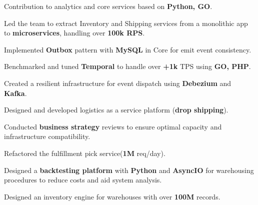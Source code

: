\documentclass[]{plushcv}
\begin{document}
\begin{minipage}[t]{0.70\textwidth}
\vspace{5pt} %
\begin{tightemize}
	\sectionsep
	\item Contribution to analytics and core services based on \textbf{Python, GO}.
\end{tightemize}
\vspace{5pt}
\begin{tightemize}
\sectionsep
\item Led the team to extract Inventory and Shipping services from a monolithic app to \textbf{microservices}, handling over \textbf{100k RPS}.
\item Implemented \textbf{Outbox} pattern with \textbf{MySQL} in Core for emit event consistency.
\item Benchmarked and tuned \textbf{Temporal} to handle over \textbf{+1k} TPS using \textbf{GO, PHP}.
\item Created a resilient infrastructure for event dispatch using \textbf{Debezium} and \textbf{Kafka}.
\item Designed and developed logistics as a service platform (\textbf{drop shipping}).
\item Conducted \textbf{business strategy} reviews to ensure optimal capacity and infrastructure compatibility.
\end{tightemize}
\vspace{5pt} %
\begin{tightemize}
\item Refactored the fulfillment pick service(\textbf{1M} req/day).
\item Designed a \textbf{backtesting platform} with \textbf{Python} and \textbf{AsyncIO} for warehousing procedures to reduce costs and aid system analysis.
\item Designed an inventory engine for warehouses with over \textbf{100M} records.
\end{tightemize}


\end{minipage}
\end{document}
